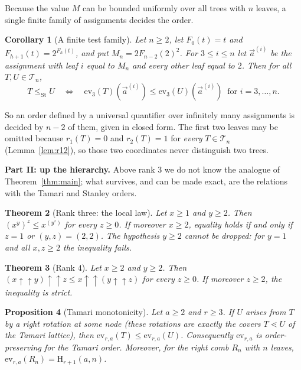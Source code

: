 \documentclass[11pt,a4paper]{article}
\theoremstyle{plain}
\newtheorem{theorem}{Theorem}[section]
\newtheorem{proposition}[theorem]{Proposition}
\newtheorem{corollary}[theorem]{Corollary}
\theoremstyle{definition}
\newcommand{\HH}{\mathrm{H}}
\newcommand{\tw}{\uparrow\uparrow}
\newcommand{\ev}{\mathrm{ev}}
\newcommand{\Tam}{\mathcal{T}}
\newcommand{\St}{\mathrm{St}}
\begin{document}
Because the value $M$ can be bounded uniformly over all trees with $n$ leaves, a single
finite family of assignments decides the order.

\begin{corollary}[A finite test family]\label{cor:test}
Let $n\ge2$, let $F_0(t)=t$ and $F_{h+1}(t)=2^{F_h(t)}$, and put $M_n=2F_{n-2}(2)^2$. For
$3\le i\le n$ let $\vec a^{(i)}$ be the assignment with leaf $i$ equal to $M_n$ and every
other leaf equal to $2$. Then for all $T,U\in\Tam_n$,
\[
  T\le_{\St}U
  \quad\Longleftrightarrow\quad
  \ev_3(T)(\vec a^{(i)})\le\ev_3(U)(\vec a^{(i)})\ \text{ for } i=3,\dots,n .
\]
\end{corollary}

So an order defined by a universal quantifier over infinitely many assignments is
decided by $n-2$ of them, given in closed form. The first two leaves may be omitted
because $r_1(T)=0$ and $r_2(T)=1$ for \emph{every} $T\in\Tam_n$
(Lemma~\ref{lem:r12}), so those two coordinates never distinguish two trees.

\medskip
\noindent\textbf{Part II: up the hierarchy.} Above rank $3$ we do not know the analogue
of Theorem~\ref{thm:main}; what survives, and can be made exact, are the relations with
the Tamari and Stanley orders.

\begin{theorem}[Rank three: the local law]\label{thm:A}
Let $x\ge1$ and $y\ge2$. Then $(x^{y})^{z}\le x^{(y^{z})}$ for every $z\ge0$.
If moreover $x\ge2$, equality holds if and only if $z=1$ or $(y,z)=(2,2)$.
The hypothesis $y\ge2$ cannot be dropped: for $y=1$ and all $x,z\ge2$ the
inequality fails.
\end{theorem}

\begin{theorem}[Rank $4$]\label{thm:B}
Let $x\ge2$ and $y\ge2$. Then $(x\tw y)\tw z\le x\tw(y\tw z)$ for every $z\ge0$.
If moreover $z\ge2$, the inequality is strict.
\end{theorem}

\begin{proposition}[Tamari monotonicity]\label{prop:tamari}
Let $a\ge2$ and $r\ge3$. If $U$ arises from $T$ by a right rotation at some node (these
rotations are exactly the covers $T\lessdot U$ of the Tamari lattice), then
$\ev_{r,a}(T)\le\ev_{r,a}(U)$.
Consequently $\ev_{r,a}$ is order-preserving for the Tamari order. Moreover, for the
right comb $R_n$ with $n$ leaves,
$\ev_{r,a}(R_n)=\HH_{r+1}(a,n)$.
\end{proposition}
\end{document}
